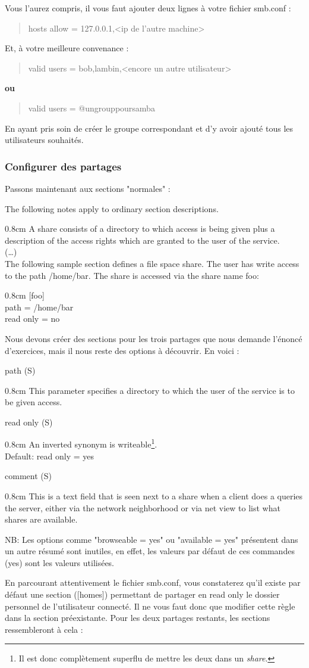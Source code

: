 \documentclass[a4paper,11pt]{article}
\newcommand{\commande}[1] {
    \begin{quote}
    \tt\raggedright #1
    \end{quote}
}
\newcommand{\man}[2]{
    \begin{tcolorbox}[toprule=3mm,width=\textwidth,outer arc=0mm,colbacktitle=grayman,coltitle=black,colback={grayman},colframe={grayman},title={man : \tt #1}]
        \tt\raggedright #2
    \end{tcolorbox}
}
\newcommand{\mandesc}[1]{
    \begin{adjustwidth}{0.8cm}{}
        #1
    \end{adjustwidth}
}
\begin{document}
\par Vous l'aurez compris, il vous faut ajouter deux lignes à votre fichier smb.conf :
\commande{hosts allow = 127.0.0.1,<ip de l'autre machine>}
\par Et, à votre meilleure convenance :
\commande{valid users = bob,lambin,<encore un autre utilisateur>}
\par \textbf{ou}
\commande{valid users = @ungrouppoursamba}
\par En ayant pris soin de créer le groupe correspondant et d'y avoir ajouté tous les utilisateurs souhaités.

\subsubsection{Configurer des partages}
\par Passons maintenant aux sections "normales" :
\man{smb.conf}{
The following notes apply to ordinary section descriptions.
\mandesc{A share consists of a directory to which access is being given plus a description of the access rights which are granted to the user of the service.\\
(\dots)\\
The following sample section defines a file space share. The user has write access to the path /home/bar. The share is accessed via the share name foo:
\mandesc{[foo]\\
path = /home/bar\\
read only = no\\}}
}
\par Nous devons créer des sections pour les trois partages que nous demande l'énoncé d'exercices, mais il nous reste des options à découvrir. En voici :
\man{smb.conf}{
path (S)
\mandesc{This parameter specifies a directory to which the user of the service is to be given access.}
read only (S)
\mandesc{An inverted synonym is writeable\footnote{Il est donc complètement superflu de mettre les deux dans un \emph{share}.}.\\
Default: read only = yes}
comment (S)
\mandesc{This is a text field that is seen next to a share when a client does a queries the server, either via the network neighborhood or via net view to list what shares are available.}
}
\par NB: Les options comme "browseable = yes" ou "available = yes" présentent dans un autre résumé sont inutiles, en effet, les valeurs par défaut de ces commandes (yes) sont les valeurs utilisées.
\par En parcourant attentivement le fichier smb.conf, vous constaterez qu'il existe par défaut une section ([homes]) permettant de partager en read only le dossier personnel de l'utilisateur connecté. Il ne vous faut donc que modifier cette règle dans la section préexistante. Pour les deux partages restants, les sections ressembleront à cela :
\end{document}
